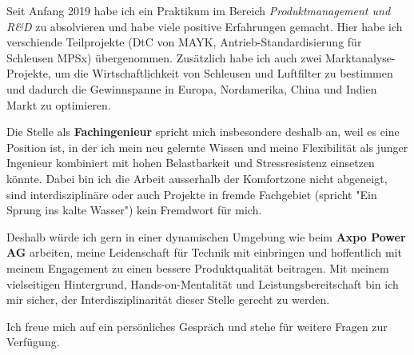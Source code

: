 \documentclass[11pt, a4paper]{awesome-cv}
\newcommand{\companyName}{Axpo Power AG}
\newcommand{\jobPosition}{Fachingenieur}
\begin{document}
\makecvheader

\makelettertitle

\begin{cvletter}
	
Seit Anfang 2019 habe ich ein Praktikum im Bereich \textit{Produktmanagement und R\&D} zu absolvieren und habe viele positive Erfahrungen gemacht. Hier habe ich verschiende Teilprojekte (DtC von MAYK, Antrieb-Standardisierung für Schleusen MPSx) übergenommen. Zusätzlich habe ich auch zwei Marktanalyse-Projekte, um die Wirtschaftlichkeit von Schleusen und Luftfilter zu bestimmen und dadurch die Gewinnspanne in Europa, Nordamerika, China und Indien Markt zu optimieren.

Die Stelle als \textbf{\jobPosition} spricht mich insbesondere deshalb an, weil es eine Position ist, in der ich mein neu gelernte Wissen und meine Flexibilität als junger Ingenieur kombiniert mit hohen Belastbarkeit und Stressresistenz einsetzen könnte. Dabei bin ich die Arbeit ausserhalb der Komfortzone nicht abgeneigt, sind interdisziplinäre oder auch Projekte in fremde Fachgebiet (spricht "Ein Sprung ins kalte Wasser") kein Fremdwort für mich. 

Deshalb würde ich gern in einer dynamischen Umgebung wie beim \textbf{\companyName} arbeiten, meine Leidenschaft für Technik mit einbringen und hoffentlich mit meinem Engagement zu einen bessere Produktqualität beitragen. Mit meinem vielseitigen Hintergrund, Hands-on-Mentalität und Leistungsbereitschaft bin ich mir sicher, der Interdisziplinarität dieser Stelle gerecht zu werden. 

Ich freue mich auf ein persönliches Gespräch und stehe für weitere Fragen zur Verfügung.

\end{cvletter}

\makeletterclosing
\end{document}
